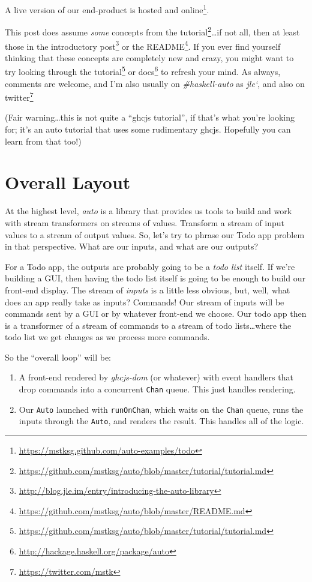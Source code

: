 \documentclass[]{article}
\renewcommand{\href}[2]{#2\footnote{\url{#1}}}
\begin{document}
A live version of our end-product
\href{https://mstksg.github.com/auto-examples/todo}{is hosted and online}.

This post does assume \emph{some} concepts from the
\href{https://github.com/mstksg/auto/blob/master/tutorial/tutorial.md}{tutorial}\ldots if
not all, then at least those in the
\href{http://blog.jle.im/entry/introducing-the-auto-library}{introductory post}
or the \href{https://github.com/mstksg/auto/blob/master/README.md}{README}. If
you ever find yourself thinking that these concepts are completely new and
crazy, you might want to try looking through the
\href{https://github.com/mstksg/auto/blob/master/tutorial/tutorial.md}{tutorial}
or \href{http://hackage.haskell.org/package/auto}{docs} to refresh your mind. As
always, comments are welcome, and I'm also usually on \emph{\#haskell-auto} as
\emph{jle`}, and also on \href{https://twitter.com/mstk}{twitter}

(Fair warning\ldots this is not quite a ``ghcjs tutorial'', if that's what
you're looking for; it's an auto tutorial that uses some rudimentary ghcjs.
Hopefully you can learn from that too!)

\section{Overall Layout}\label{overall-layout}

At the highest level, \emph{auto} is a library that provides us tools to build
and work with stream transformers on streams of values. Transform a stream of
input values to a stream of output values. So, let's try to phrase our Todo app
problem in that perspective. What are our inputs, and what are our outputs?

For a Todo app, the outputs are probably going to be a \emph{todo list} itself.
If we're building a GUI, then having the todo list itself is going to be enough
to build our front-end display. The stream of \emph{inputs} is a little less
obvious, but, well, what does an app really take as inputs? Commands! Our stream
of inputs will be commands sent by a GUI or by whatever front-end we choose. Our
todo app then is a transformer of a stream of commands to a stream of todo
lists\ldots where the todo list we get changes as we process more commands.

So the ``overall loop'' will be:

\begin{enumerate}
\def\labelenumi{\arabic{enumi}.}
\tightlist
\item
  A front-end rendered by \emph{ghcjs-dom} (or whatever) with event handlers
  that drop commands into a concurrent \texttt{Chan} queue. This just handles
  rendering.
\item
  Our \texttt{Auto} launched with \texttt{runOnChan}, which waits on the
  \texttt{Chan} queue, runs the inputs through the \texttt{Auto}, and renders
  the result. This handles all of the logic.
\end{enumerate}
\end{document}
